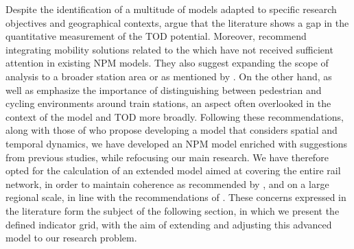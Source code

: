 \begin{refsegment}
Despite the identification of a multitude of models adapted to specific research objectives and geographical contexts, \textcolor{blue}{\textcite[394]{ibrahim_planning_2022}} argue that the literature shows a gap in the quantitative measurement of the \acrshort{TOD} potential. Moreover, \textcolor{blue}{\textcite[10-12]{olaru_place_2019}} recommend integrating mobility solutions related to the  which have not received sufficient attention in existing \acrshort{NPM} models. They also suggest expanding the scope of analysis to a broader station area or  as mentioned by \textcolor{blue}{\textcite[280]{li_transit_2019}}. On the other hand, \textcolor{blue}{\textcite[80]{robillard_transit-oriented_2024}} as well as \textcolor{blue}{\textcite[120]{nigro_land_2019}} emphasize the importance of distinguishing between pedestrian and cycling environments around train stations, an aspect often overlooked in the context of the model and \acrshort{TOD} more broadly. Following these recommendations, along with those of \textcolor{blue}{\textcite[9]{motieyan_development_2018}} who propose developing a model that considers spatial and temporal dynamics, we have developed an \acrshort{NPM} model enriched with suggestions from previous studies, while refocusing our main research. We have therefore opted for the calculation of an extended model aimed at covering the entire rail network, in order to maintain coherence as recommended by \textcolor{blue}{\autocite[58]{chorus_application_2011}}, and on a large regional scale, in line with the recommendations of \textcolor{blue}{\textcite[643]{wei_classifying_2023}}. These concerns expressed in the literature form the subject of the following section, in which we present the defined indicator grid, with the aim of extending and adjusting this advanced model to our research problem.%


\end{refsegment}
